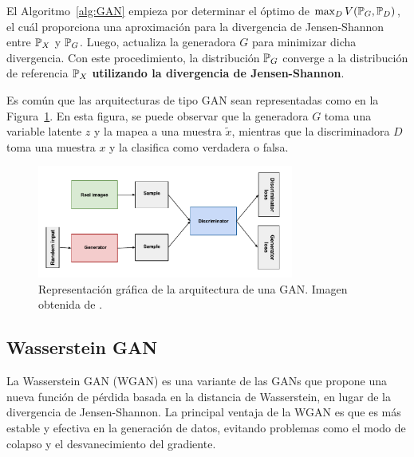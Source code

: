 \begin{remark}
    El Algoritmo~\ref{alg:GAN} empieza por determinar el óptimo de $\max_D V( \Prob_G , \Prob_D )$, el cuál proporciona una aproximación para la divergencia de Jensen-Shannon entre $\Prob_X$ y $\Prob_G$. Luego, actualiza la generadora $G$ para minimizar dicha divergencia. Con este procedimiento, la distribución $\Prob_G$ converge a la distribución de referencia $\Prob_X$ \textbf{utilizando la divergencia de Jensen-Shannon}.
\end{remark}

Es común que las arquitecturas de tipo GAN sean representadas como en la Figura~\ref{fig:gan-diagram}. En esta figura, se puede observar que la generadora $G$ toma una variable latente $z$ y la mapea a una muestra $\tilde x$, mientras que la discriminadora $D$ toma una muestra $x$ y la clasifica como verdadera o falsa.

\begin{figure}[H]
    \centering
    \includegraphics[width=0.75\textwidth]{img/gan/gan_diagram.pdf}
    \caption{Representación gráfica de la arquitectura de una GAN. Imagen obtenida de \cite{googlegan}.}
    \label{fig:gan-diagram}
\end{figure}






\subsection{Wasserstein GAN}\label{ssec:wasserstein-gan}  %

La Wasserstein GAN (WGAN) \cite{arjovsky2017wasserstein} es una variante de las GANs que propone una nueva función de pérdida basada en la distancia de Wasserstein, en lugar de la divergencia de Jensen-Shannon. La principal ventaja de la WGAN es que es más estable y efectiva en la generación de datos, evitando problemas como el modo de colapso y el desvanecimiento del gradiente.

